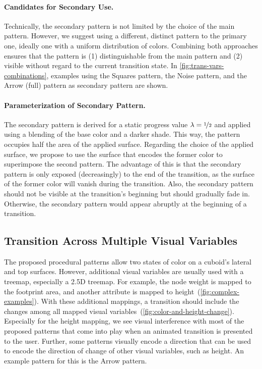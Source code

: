 \documentclass[smallextended,natbib]{svjour3}       %
\begin{document}
\paragraph{Candidates for Secondary Use.}
Technically, the secondary pattern is not limited by the choice of the main pattern.
However, we suggest using a different, distinct pattern to the primary one, ideally one with a uniform distribution of colors.
Combining both approaches ensures that the pattern is (1) distinguishable from the main pattern and (2) visible without regard to the current transition state.
In \autoref{fig:trans-vars-combinations}, examples using the Squares pattern, the Noise pattern, and the Arrow (full) pattern as secondary pattern are shown.

\paragraph{Parameterization of Secondary Pattern.}
The secondary pattern is derived for a static progress value $\lambda = \nicefrac{1}{2}$ and applied using a blending of the base color and a darker shade.
This way, the pattern occupies half the area of the applied surface.
Regarding the choice of the applied surface, we propose to use the surface that encodes the former color to superimpose the second pattern.
The advantage of this is that the secondary pattern is only exposed (decreasingly) to the end of the transition, as the surface of the former color will vanish during the transition.
Also, the secondary pattern should not be visible at the transition's beginning but should gradually fade in.
Otherwise, the secondary pattern would appear abruptly at the beginning of a transition.

\subsection{Transition Across Multiple Visual Variables}

The proposed procedural patterns allow two states of color on a cuboid's lateral and top surfaces.
However, additional visual variables are usually used with a treemap, especially a 2.5D treemap.
For example, the node weight is mapped to the footprint area, and another attribute is mapped to height~(\autoref{fig:complex-examples}).
With these additional mappings, a transition should include the changes among all mapped visual variables~(\autoref{fig:color-and-height-change}).
Especially for the height mapping, we see visual interference with most of the proposed patterns that come into play when an animated transition is presented to the user.
Further, some patterns visually encode a direction that can be used to encode the direction of change of other visual variables, such as height.
An example pattern for this is the Arrow pattern.
\end{document}
